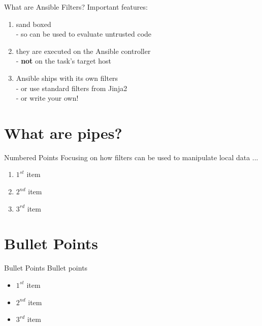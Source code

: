 \documentclass[pdf]{beamer}
\begin{document}
\begin{frame}{What are Ansible Filters?}
  Important features:
  \begin{enumerate}
    \item{} sand boxed \\
    \pause{} - so can be used to evaluate untrusted code
    \pause{}
    \item{} they are executed on the Ansible controller \\
    \pause{} - \textbf{not} on the task's target host
		\item{} Ansible ships with its own filters \\
    \pause{} - or use standard filters from Jinja2 \\
    \pause{} - or write your own!
  \end{enumerate}
\end{frame}

\section{What are pipes?}
\begin{frame}{Numbered Points}
  Focusing on how filters can be used to manipulate local data ...
  \begin{enumerate}
    \item{} $1^{st}$ item
    \item{} $2^{nd}$ item
    \item{} $3^{rd}$ item
  \end{enumerate}
\end{frame}

\section{Bullet Points}
\begin{frame}{Bullet Points}
  Bullet points
  \begin{itemize}
    \item{} $1^{st}$ item
    \item{} $2^{nd}$ item
    \item{} $3^{rd}$ item
  \end{itemize}
\end{frame}
\end{document}
